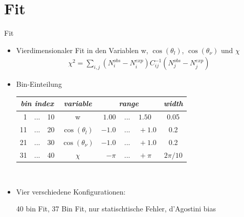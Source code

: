 \documentclass{beamer}
\begin{document}
\section{Fit}
\begin{frame}{Fit}
\begin{itemize}
\item
Vierdimensionaler Fit in den Variablen w, $\cos(\theta_l)$, $\cos(\theta_{\nu})$ und $\chi$
\begin{align*}
\chi^2=\sum_{i,j}(N_i^{obs}-N_i^{exp})C_{ij}^{-1}(N_j^{obs}-N_j^{exp})
\end{align*}
\item Bin-Einteilung
\small
\begin{center}
\begin{tabular}[h]{r@{}c@{}lcr@{}c@{}lc}
\hline
\multicolumn{3}{c}{\textit{bin index}}
& \multicolumn{1}{c}{\textit{variable}}
& \multicolumn{3}{c}{\textit{range}}
& \multicolumn{1}{c}{\textit{width}}\\
\hline
  1&...&10 & w &  $1.00\,$ &...& $\,1.50$ & 0.05 \\  
    11&...&20 & $\cos(\theta_l)$ & $-1.0\,$ &...& $\,+1.0$ & 0.2\\    
    21&...&30 & $\cos(\theta_{\nu})$ & $-1.0\,$ &...& $\,+1.0$ & 0.2\\    
    31&...&40 & $\chi$ & $-\pi\,$ &...& $\,+\pi$ & $2 \pi/10$\\   
\hline
\end{tabular}\\
\end{center}
\normalsize
\vspace{0.2cm}
\item Vier verschiedene Konfigurationen:

40 bin Fit, 37 Bin Fit, nur statischtische Fehler, d'Agostini bias
\end{itemize}


\end{frame}


\end{document}
